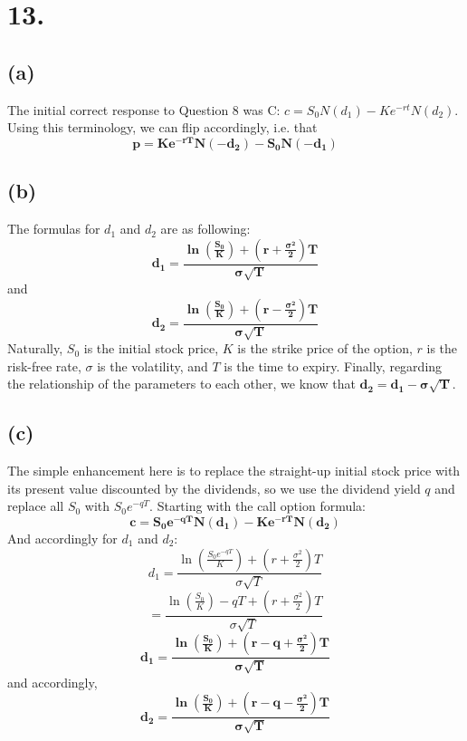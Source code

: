 \documentclass{article}
\begin{document}
\thispagestyle{firstpageheader}
{\Large 

\section*{13.}

\subsection*{(a)} 

The initial correct response to Question 8 was C: \(c = S_0 N(d_1) - Ke^{-rt} N(d_2)\). Using this terminology, we can flip accordingly, i.e. that
\[
  \boxed{\mathbf{p = Ke^{-rT} N(-d_2) - S_0 N(-d_1)}}
\]

\subsection*{(b)}

The formulas for \(d_1\) and \(d_2\) are as following:
\[
  \boxed{\mathbf{d_1 = \frac{\ln(\frac{S_0}{K}) + (r + \frac{\sigma^2}{2})T}{\sigma \sqrt{T}}}}
\]
and 
\[
  \boxed{\mathbf{d_2 = \frac{\ln(\frac{S_0}{K}) + (r - \frac{\sigma^2}{2})T}{\sigma \sqrt{T}}}}
\]
Naturally, \(S_0\) is the initial stock price, \(K\) is the strike price of the option, \(r\) is the risk-free rate, \(\sigma\) is the volatility, and \(T\) is the time to expiry. Finally, regarding the relationship of the parameters to each other, we know that \(\boxed{\mathbf{d_2 = d_1 - \sigma \sqrt{T}}}\).

\subsection*{(c)}
The simple enhancement here is to replace the straight-up initial stock price with its present value discounted by the dividends, so we use the dividend yield \(q\) and replace all \(S_0\) with \(S_0 e^{-qT}\). Starting with the call option formula:
\[
  \boxed{\mathbf{c = S_0e^{-qT} N(d_1) - Ke^{-rT} N(d_2) }}
\]
And accordingly for \(d_1\) and \(d_2\): 
\[
  d_1 = \frac{\ln(\frac{S_0e^{-qT}}{K}) + (r + \frac{\sigma^2}{2})T}{\sigma \sqrt{T}}
\]
\[
  = \frac{\ln(\frac{S_0}{K}) - qT + (r + \frac{\sigma^2}{2})T}{\sigma \sqrt{T}}
\]
\[
  \boxed{\mathbf{d_1 = \frac{\ln(\frac{S_0}{K}) + (r - q + \frac{\sigma^2}{2})T}{\sigma \sqrt{T}}}}
\]
and accordingly, 
\[
  \boxed{\mathbf{d_2 = \frac{\ln(\frac{S_0}{K}) + (r - q - \frac{\sigma^2}{2})T}{\sigma \sqrt{T}}}}
\]

}
\end{document}
